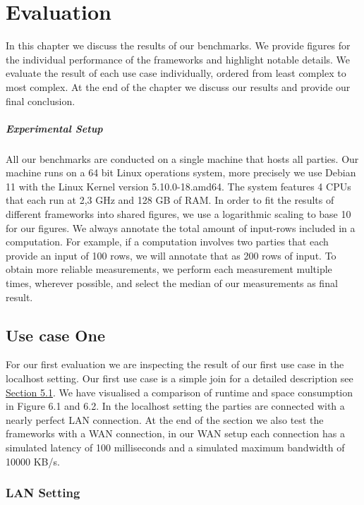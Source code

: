 \chapter{Evaluation}
\label{evaluation}	
In this chapter we discuss the results of our benchmarks. We provide figures for the individual performance of the frameworks and highlight notable details. We evaluate the result of each use case individually, ordered from least complex to most complex. At the end of the chapter we discuss our results and provide our final conclusion.
\paragraph{Experimental Setup}
All our benchmarks are conducted on a single machine that hosts all parties. Our machine runs on a 64 bit Linux operations system, more precisely we use Debian 11 with the Linux Kernel version 5.10.0-18.amd64. The system features 4 CPUs that each run at 2,3 GHz and 128 GB of RAM. In order to fit the results of different frameworks into shared figures, we use a logarithmic scaling to base 10 for our figures. We always annotate the total amount of input-rows included in a computation. For example, if a computation involves two parties that each provide an input of 100 rows, we will annotate that as 200 rows of input. To obtain more reliable measurements, we perform each measurement multiple times, wherever possible, and select the median of our measurements as final result.
\section{Use case One}
For our first evaluation we are inspecting the result of our first use case in the localhost setting. Our first use case is a simple join for a detailed description see \hyperref[Use Case]{Section 5.1}. We have visualised a comparison of runtime and space consumption in Figure 6.1 and 6.2. In the localhost setting the parties are connected with a nearly perfect LAN connection. At the end of the section we also test the frameworks with a WAN connection, in our WAN setup each connection has a simulated latency of 100 milliseconds and a simulated maximum bandwidth of 10000 KB/s.
\subsection{LAN Setting}
